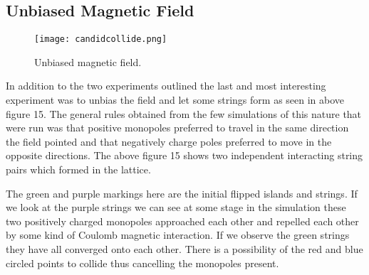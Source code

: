 \subsection{Unbiased Magnetic Field}
\begin{figure}[ht!]
    \begin{center}
        \texttt{[image: candidcollide.png]}
        \caption[Island flip run]{Unbiased magnetic field.}
        \label{fig:gf14}
    \end{center}
\end{figure}
In addition to the two experiments outlined the last and most interesting experiment was to unbias the field and let some strings form as seen in above figure 15.  The general rules obtained from the few simulations of this nature that were run was that positive monopoles preferred to travel in the same direction the field pointed and that negatively charge poles preferred to move in the opposite directions.  The above figure 15 shows two independent interacting string pairs which formed in the lattice.
\par
The green and purple markings here are the initial flipped islands and strings.  If we look at the purple strings we can see at some stage in the simulation these two positively charged monopoles approached each other and repelled each other by some kind of Coulomb magnetic interaction.  If we observe the green strings they have all converged onto each other.  There is a possibility of the red and blue circled points to collide thus cancelling the monopoles present.
\clearpage
